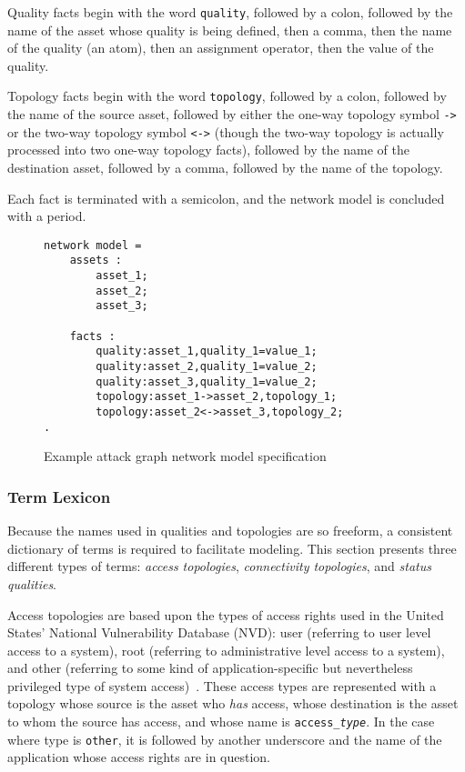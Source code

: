 \documentclass{article}
\begin{document}
Quality facts begin with the word \texttt{quality}, followed by a colon,
followed by the name of the asset whose quality is being defined, then a comma,
then the name of the quality (an atom), then an assignment operator, then the 
value of the quality.

Topology facts begin with the word \texttt{topology}, followed by a colon,
followed by the name of the source asset, followed by either the one-way
topology symbol \texttt{->} or the two-way topology symbol \texttt{<->} (though
the two-way topology is actually processed into two one-way topology facts),
followed by the name of the destination asset, followed by a comma, followed
by the name of the topology.

Each fact is terminated with a semicolon, and the network model is concluded 
with a period.
\begin{figure}
\begin{lstlisting}
network model = 
    assets :
        asset_1;
        asset_2;
        asset_3;

    facts :
        quality:asset_1,quality_1=value_1;
        quality:asset_2,quality_1=value_2;        
        quality:asset_3,quality_1=value_2;
        topology:asset_1->asset_2,topology_1;
        topology:asset_2<->asset_3,topology_2;
.
\end{lstlisting}
\caption{Example attack graph network model specification}
\label{ag_illustrative}
\end{figure}
\subsubsection{Term Lexicon}
Because the names used in qualities and topologies are so freeform, a consistent
dictionary of terms is required to facilitate modeling. This section
presents three different types of terms: \emph{access topologies}, 
\emph{connectivity topologies}, and \emph{status qualities}.

Access topologies are based upon the types of access rights used in the
United States' National Vulnerability Database (NVD): user (referring to 
user level access to a system), root (referring to administrative level access 
to a system), and other (referring to some kind of application-specific but
nevertheless privileged type of system access)~\cite{nvdhome}. These
access types are represented with a topology whose source is the asset
who \emph{has} access, whose destination is the asset to whom the source has
access, and whose name is \texttt{access\_\emph{type}}. In the case where type
is \texttt{other}, it is followed by another underscore and the name of the
application whose access rights are in question.
\end{document}
